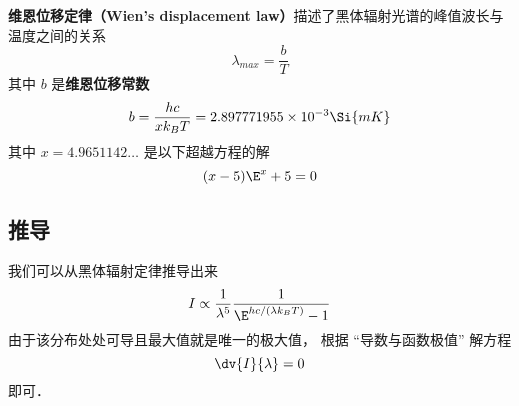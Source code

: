 
\textbf{维恩位移定律（Wien's displacement law）}描述了黑体辐射光谱的峰值波长与温度之间的关系
\begin{equation}
\lambda_{max} = \frac{b}{T}
\end{equation}
其中 $b$ 是\textbf{维恩位移常数}
\begin{equation}
b = \frac{hc}{xk_B T} = 2.897771955\times 10^{-3} \Si{mK}
\end{equation}
其中 $x = 4.9651142\dots$ 是以下超越方程的解
\begin{equation}
(x-5)\E^x + 5 = 0
\end{equation}

\subsection{推导}
我们可以从黑体辐射定律推导出来
\begin{equation}
I \propto \frac{1}{\lambda^5} \frac{1}{\E^{hc/(\lambda k_B T)} - 1}
\end{equation}
由于该分布处处可导且最大值就是唯一的极大值， 根据 “导数与函数极值” 解方程
\begin{equation}
\dv{I}{\lambda} = 0
\end{equation}
即可．
